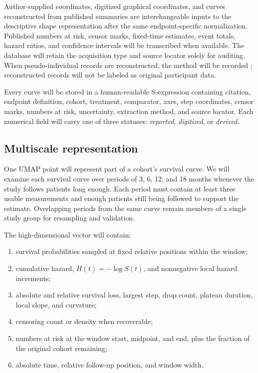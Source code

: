 \documentclass[17pt]{extarticle}
\begin{document}
Author-supplied coordinates, digitized graphical coordinates, and curves reconstructed from published summaries are interchangeable inputs to the descriptive shape representation after the same endpoint-specific normalization. Published numbers at risk, censor marks, fixed-time estimates, event totals, hazard ratios, and confidence intervals will be transcribed when available. The database will retain the acquisition type and source locator solely for auditing. When pseudo-individual records are reconstructed, the method will be recorded \citep{guyot2012ipd}; reconstructed records will not be labeled as original participant data.

Every curve will be stored in a human-readable S-expression containing citation, endpoint definition, cohort, treatment, comparator, axes, step coordinates, censor marks, numbers at risk, uncertainty, extraction method, and source locator. Each numerical field will carry one of three statuses: \emph{reported}, \emph{digitized}, or \emph{derived}.

\subsection{Multiscale representation}

One UMAP point will represent part of a cohort's survival curve. We will examine each survival curve over periods of 3, 6, 12, and 18 months whenever the study follows patients long enough. Each period must contain at least three usable measurements and enough patients still being followed to support the estimate. Overlapping periods from the same curve remain members of a single study group for resampling and validation.

The high-dimensional vector will contain:
\begin{enumerate}
  \item survival probabilities sampled at fixed relative positions within the window;
  \item cumulative hazard, $H(t)=-\log S(t)$, and nonnegative local hazard increments;
  \item absolute and relative survival loss, largest step, drop count, plateau duration, local slope, and curvature;
  \item censoring count or density when recoverable;
  \item numbers at risk at the window start, midpoint, and end, plus the fraction of the original cohort remaining;
  \item absolute time, relative follow-up position, and window width.
\end{enumerate}
\end{document}
